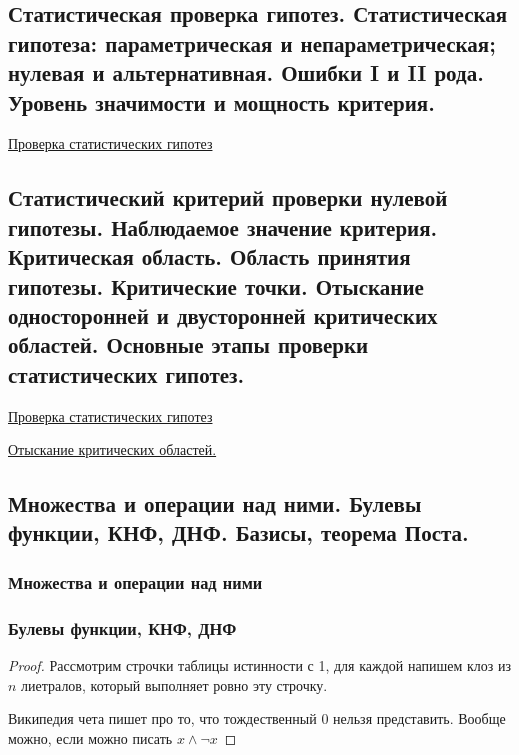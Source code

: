 \documentclass{article}
\begin{document}
\subsection{Статистическая проверка гипотез. Статистическая гипотеза: параметрическая и
непараметрическая; нулевая и альтернативная. Ошибки I и II рода. Уровень
значимости и мощность критерия.}

\href{
	http://www.machinelearning.ru/wiki/index.php?title=%
}{Проверка статистических гипотез}


\subsection{Статистический критерий проверки нулевой гипотезы. Наблюдаемое значение
критерия. Критическая область. Область принятия гипотезы. Критические точки.
Отыскание односторонней и двусторонней критических областей. Основные
этапы проверки статистических гипотез.}

\href{
	http://www.machinelearning.ru/wiki/index.php?title=%
}{Проверка статистических гипотез}

\href{
	https://studme.org/290347/matematika_himiya_fizik/otyskanie_levostoronney_dvustoronney_kriticheskih_oblastey
}{
	Отыскание критических областей.
}

\subsection{Множества и операции над ними. Булевы функции, КНФ, ДНФ. Базисы, теорема
Поста.}

\subsubsection{Множества и операции над ними}

\subsubsection{Булевы функции, КНФ, ДНФ}
\begin{proof}
	Рассмотрим строчки таблицы истинности с 1, для каждой напишем клоз из $n$ лиетралов, который выполняет ровно эту строчку.
	
	Википедия чета пишет про то, что тождественный 0 нельзя представить. Вообще можно, если можно писать $x \wedge \neg x$
\end{proof}
\end{document}
